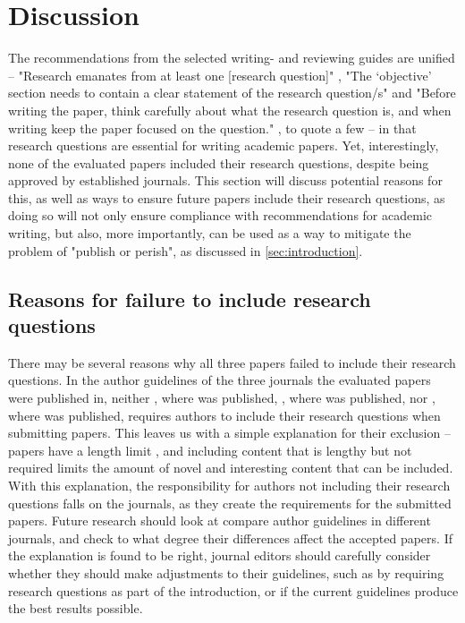 \section{Discussion}
The recommendations from the selected writing- and reviewing guides are unified -- "Research emanates from at least one [research question]" \parencite[p.596]{Martenson_2016}, "The ‘objective’ section needs to contain a clear statement of the research question/s" \parencite[p.115]{Cuschieri_2019} and "Before writing the paper, think carefully about what the research question is, and when writing keep the paper focused on the question." \parencite[p.357]{Davidson_2012}, to quote a few -- in that research questions are essential for writing academic papers. Yet, interestingly, none of the evaluated papers included their research questions, despite being approved by established journals. This section will discuss potential reasons for this, as well as ways to ensure future papers include their research questions, as doing so will not only ensure compliance with recommendations for academic writing, but also, more importantly, can be used as a way to mitigate the problem of "publish or perish", as discussed in \autoref{sec:introduction}.


\subsection{Reasons for failure to include research questions}
\label{sec:discussion-reason}
There may be several reasons why all three papers failed to include their research questions. In the author guidelines of the three journals the evaluated papers were published in, neither \textcite{Elsevier_guide}, where \textcite{Barredo_2020} was published, \textcite{IEEE_guide}, where \textcite{Vakkuri_2020} was published, nor \textcite{WIREs_guide}, where \textcite{Ntoutsi_2020} was published, requires authors to include their research questions when submitting papers. This leaves us with a simple explanation for their exclusion -- papers have a length limit \parencite{IEEE_guide}, and including content that is lengthy but not required limits the amount of novel and interesting content that can be included. With this explanation, the responsibility for authors not including their research questions falls on the journals, as they create the requirements for the submitted papers. Future research should look at compare author guidelines in different journals, and check to what degree their differences affect the accepted papers. If the explanation is found to be right, journal editors should carefully consider whether they should make adjustments to their guidelines, such as by requiring research questions as part of the introduction, or if the current guidelines produce the best results possible.

